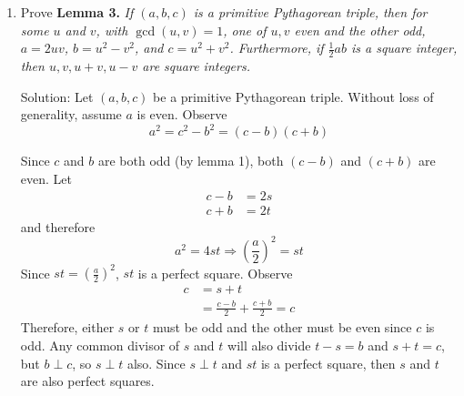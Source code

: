 \documentclass[10pt]{article}
\newcommand{\Z}{\mathbb{Z}}
\newcommand{\solution}{\color{blue} Solution: \color{black}}
\begin{document}
\begin{enumerate}
            We see $(A,B,C)$ is also a Pythagorean triple as 
            \[A^2 + B^2 = d^2a^2 + d^2b^2 = d^2(a^2 + b^2) = d^2c^2 = C^2\]
            
            To find a primitive triple, let $g = \gcd(A,B,C)$ and define
            \[A' = A/g, B' = B/g, C' = C/g\]
            then these are all coprime and 
            \[A'^2 + B'^2 = \frac{A^2 + B^2}{g^2} = \frac{C^2}{g^2} = C'^2\]
	        therefore, $(A', B', C')$ is a primitive Pythagorean triple.\\

            But wait! There's more! The area of $\triangle A'B'C'$ is also a square integer. Either $A'$ or $B'$ is even by lemma 1, so $\text{area} = \frac{1}{2} A'B'$ is an integer. Observe
            \[\frac{1}{2} A'B' = \frac{AB}{2g^2} = \frac{d^2ab}{2g^2} = \frac{d^2 \frac{1}{2}ab}{g^2} = \frac{d^2n^2}{g^2}\]
            We can see since $\frac{d^2n^2}{g^2}$ is an integer that $\frac{dn}{g}$ is a rational whose square is an integer. The only rational whose squares are integers are themselves integers, meaning $\frac{dn}{g} \in \Z$ and therefore 
            \[\frac{1}{2}A'B' = \left(\frac{dn}{g}\right)^2\]
            is a perfect square. $\hfill\blacksquare$\\

        \item Prove {\bf Lemma 3.} \emph{If $(a,b,c)$ is a primitive Pythagorean triple, then for some $u$ and $v$, with $\gcd(u,v)=1$, one of $u,v$ even and the other odd, $a=2uv$, $b = u^2 - v^2$, and $c =u^2 +v^2$. Furthermore, if $\frac{1}{2}ab$ is a square integer, then $u,v,u+v, u-v$ are square integers.}

            \solution Let $(a,b,c)$ be a primitive Pythagorean triple. Without loss of generality, assume $a$ is even. Observe
            \[a^2 = c^2 - b^2 = (c-b)(c+b)\]

            Since $c$ and $b$ are both odd (by lemma 1), both $(c-b)$ and $(c+b)$ are even. Let
            \begin{align*}
                c-b &= 2s\\
                c+b &= 2t
            \end{align*}
            and therefore
            \[a^2 = 4st \Rightarrow \left(\frac{a}{2}\right)^2 = st\]
            Since $st = \left(\frac{a}{2}\right)^2$, $st$ is a perfect square. Observe
            \begin{align*}
                c &= s + t\\
                  &= \frac{c-b}{2} + \frac{c+b}{2} = c
            \end{align*}
            Therefore, either $s$ or $t$ must be odd and the other must be even since $c$ is odd. Any common divisor of $s$ and $t$ will also divide $t-s = b$ and $s + t = c$, but $b \perp c$, so $s \perp t$ also. Since $s \perp t$ and $st$ is a perfect square, then $s$ and $t$ are also perfect squares.\\


\end{enumerate}
\end{document}
